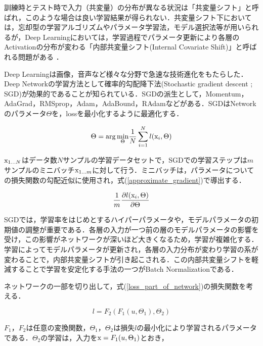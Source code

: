 訓練時とテスト時で入力（共変量）の分布が異なる状況は「共変量シフト」と呼ばれ，このような場合は良い学習結果が得られない．共変量シフト下においては，忘却型の学習アルゴリズムやパラメータ学習法，モデル選択法等が用いられる\cite{cov_shift}が，Deep Learningにおいては，学習過程でパラメータ更新により各層のActivationの分布が変わる「内部共変量シフト(Internal Covariate Shift)」と呼ばれる問題がある\cite{bn_abs} \cite{bn_google}．

Deep Learningは画像，音声など様々な分野で急速な技術進化をもたらした．Deep Networkの学習方法として確率的勾配降下法(Stochastic gradient descent ; SGD)が効果的であることが知られている\cite{sgd_overview}．SGDの派生として，Momentum，AdaGrad，RMSprop，Adam，AdaBound，RAdamなどがある．SGDはNetworkのパラメータ$\Theta$を，lossを最小化するように最適化する．

\begin{equation}
	\Theta = {\rm arg}\,\underset{\Theta}{\rm min}\frac{1}{N}\sum_{i=1}^{N}l({\rm x}_i, \Theta)
\end{equation}

${\rm x}_{1...N}$はデータ数$N$サンプルの学習データセットで，SGDでの学習ステップは$m$サンプルのミニバッチ${\rm x}_{1...m}$に対して行う．ミニバッチは，パラメータについての損失関数の勾配近似に使用され，式(\ref{approximate_gradient})で導出する．

\begin{equation}
\label{approximate_gradient}
	\frac{1}{m}\frac{\partial l({\rm x}_i, \Theta)}{\partial \Theta}
\end{equation}

SGDでは，学習率をはじめとするハイパーパラメータや，モデルパラメータの初期値の調整が重要である．各層の入力が一つ前の層のモデルパラメータの影響を受け，この影響がネットワークが深いほど大きくなるため，学習が複雑化する．学習によってモデルパラメータが更新され，各層の入力分布が変わり学習の系が変わることで，内部共変量シフトが引き起こされる．この内部共変量シフトを軽減することで学習を安定化する手法の一つがBatch Normalizationである．

ネットワークの一部を切り出して，式(\ref{loss_part_of_network})の損失関数を考える．

\begin{equation}
\label{loss_part_of_network}
	l = F_2(F_1(u, \Theta_1), \Theta_2)
\end{equation}

$F_1，F_2$は任意の変換関数，$\Theta_1，\Theta_2$は損失$l$の最小化により学習されるパラメータである．$\Theta_2$の学習は，入力を${\rm x} = F_1(u, \Theta_1)$とおき，

